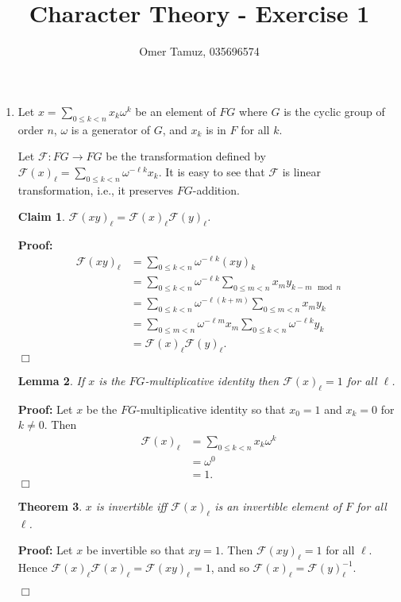 \documentclass[11pt]{article} \usepackage{amssymb}
\newtheorem{theorem}{Theorem}[section]
\newtheorem{lemma}[theorem]{Lemma}
\newtheorem{claim}[theorem]{Claim}
\newenvironment{proof}{\noindent \textbf{Proof:}}{$\Box$}
\newcommand{\cF}{\mathcal{F}}
\begin{document}
\title{Character Theory - Exercise 1}

 \author{Omer Tamuz, 035696574}
\maketitle


\begin{enumerate}
\item Let $x = \sum_{0 \leq k < n}x_k\omega^k$ be an element of $FG$
  where $G$ is the cyclic group of order $n$, $\omega$ is a
  generator of $G$, and $x_k$ is in $F$ for all $k$.

  Let $\cF:FG \to FG$ be the transformation defined by $\cF(x)_\ell =
  \sum_{0 \leq k < n}\omega^{-\ell k}x_k$. It is easy to see that
  $\cF$ is linear transformation, i.e., it preserves $FG$-addition.

  \begin{claim}
    $\cF(xy)_\ell = \cF(x)_\ell\cF(y)_\ell$.
  \end{claim}
  \begin{proof}
    \begin{align*}
      \cF(xy)_\ell &= \sum_{0 \leq k < n}\omega^{-\ell k}(xy)_k \\
      &= \sum_{0 \leq k < n}\omega^{-\ell k}\sum_{0 \leq m < n}x_my_{k-m \mod n} \\
      &= \sum_{0 \leq k < n}\omega^{-\ell (k+m)}\sum_{0 \leq m < n}x_my_{k} \\
      &= \sum_{0 \leq m < n}\omega^{-\ell m}x_m\sum_{0 \leq k < n}\omega^{-\ell k}y_{k} \\
      &= \cF(x)_\ell\cF(y)_\ell.
    \end{align*}
  \end{proof}
  
  \begin{lemma}
    If $x$ is the $FG$-multiplicative identity then $\cF(x)_\ell=1$
    for all $\ell$.
  \end{lemma}
  \begin{proof}
    Let $x$ be the $FG$-multiplicative identity so that $x_0 = 1$ and
    $x_k=0$ for $k \neq 0$. Then
    \begin{align*}
      \cF(x)_\ell &= \sum_{0 \leq k < n}x_k\omega^k \\
      &= \omega^0 \\
      &= 1.
    \end{align*}
  \end{proof}
  
  \begin{theorem}
    $x$ is invertible iff $\cF(x)_\ell$ is an invertible element of
    $F$ for all $\ell$.
  \end{theorem}
  \begin{proof}
    Let $x$ be invertible so that $xy=1$. Then $\cF(xy)_\ell=1$ for
    all $\ell$. Hence $\cF(x)_\ell\cF(x)_\ell = \cF(xy)_\ell = 1$, and
    so $\cF(x)_\ell = \cF(y)_\ell^{-1}$.


\end{proof}
\end{enumerate}
\end{document}
